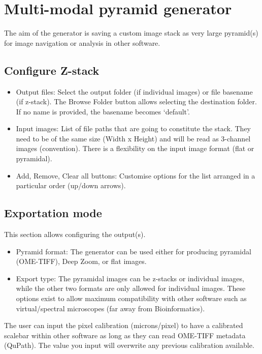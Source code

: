 	\section{Multi-modal pyramid generator}
	
	The aim of the generator is saving a custom image stack as very large pyramid(s) for image navigation or analysis in other software.
	
	\subsection{Configure Z-stack}
	
	\begin{itemize}		
		\item Output files: Select the output folder (if individual images) or file basename (if z-stack). The Browse Folder button allows selecting the destination folder. If no name is provided, the basename becomes `default'.
		\item Input images: List of file paths that are going to constitute the stack. They need to be of the same size (Width x Height) and will be read as 3-channel images (convention). There is a flexibility on the input image format (flat or pyramidal).
		\item Add, Remove, Clear all buttons: Customise options for the list arranged in a particular order (up/down arrows).
		
	\end{itemize}
	
	\subsection{Exportation mode}
	
	This section allows configuring the output(s). 
	
	\begin{itemize}
		\item Pyramid format: The generator can be used either for producing pyramidal (OME-TIFF), Deep Zoom, or flat images. 
		\item Export type: The pyramidal images can be z-stacks or individual images, while the other two formats are only allowed for individual images. These options exist to allow maximum compatibility with other software such as virtual/spectral microscopes (far away from Bioinformatics).
	
	\end{itemize}
	
	The user can input the pixel calibration (microns/pixel) to have a calibrated scalebar within other software as long as they can read OME-TIFF metadata (QuPath). The value you input will overwrite any previous calibration available.
	
